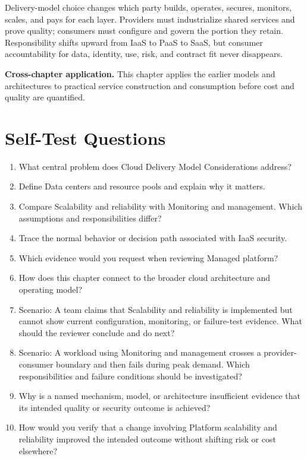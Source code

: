 \documentclass[11pt]{article}
\begin{document}
\begin{synthesisbox}
Delivery-model choice changes which party builds, operates, secures, monitors, scales, and pays for each layer. Providers must industrialize shared services and prove quality; consumers must configure and govern the portion they retain. Responsibility shifts upward from IaaS to PaaS to SaaS, but consumer accountability for data, identity, use, risk, and contract fit never disappears.
\par\smallskip
\textbf{Cross-chapter application.} This chapter applies the earlier models and architectures to practical service construction and consumption before cost and quality are quantified.
\end{synthesisbox}
\section{Self-Test Questions}
\begin{enumerate}
\item What central problem does Cloud Delivery Model Considerations address?
\item Define Data centers and resource pools and explain why it matters.
\item Compare Scalability and reliability with Monitoring and management. Which assumptions and responsibilities differ?
\item Trace the normal behavior or decision path associated with IaaS security.
\item Which evidence would you request when reviewing Managed platform?
\item How does this chapter connect to the broader cloud architecture and operating model?
\item Scenario: A team claims that Scalability and reliability is implemented but cannot show current configuration, monitoring, or failure-test evidence. What should the reviewer conclude and do next?
\item Scenario: A workload using Monitoring and management crosses a provider-consumer boundary and then fails during peak demand. Which responsibilities and failure conditions should be investigated?
\item Why is a named mechanism, model, or architecture insufficient evidence that its intended quality or security outcome is achieved?
\item How would you verify that a change involving Platform scalability and reliability improved the intended outcome without shifting risk or cost elsewhere?
\end{enumerate}
\clearpage
\end{document}
